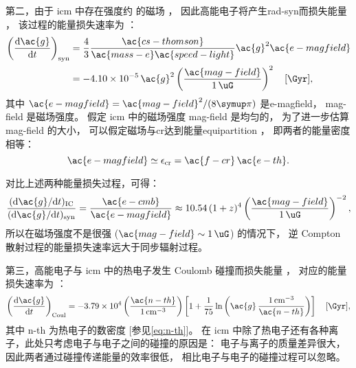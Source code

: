 第二，由于 \ac{icm} 中存在强度约 \si{\uG} 的磁场 \cite{govoni2004,ryu2008}，
因此高能电子将产生\ac{rad-syn}而损失能量 \cite{rybicki1979}，
该过程的能量损失速率为 \cite{sarazin1999}：
\begin{align}
  \label{eq:eloss-syn}
  \left( \diff{\ac{g}}{t} \right)_{\R{syn}}
    & = \frac{4}{3} \frac{\ac{cs-thomson}}{\ac{mass-e} \ac{speed-light}}
        \ac{g}^2 \ac{e-magfield} \\
    & = \num{-4.10e-5} \,\ac{g}^2
        \left( \frac{\ac{mag-field}}{\SI{1}{\uG}} \right)^2
        \quad [\si{\per\Gyr}] ,
\end{align}
其中 $\ac{e-magfield} = \ac{mag-field}^2 / (8\Cpi)$ 是\acl{e-magfield}，
\ac{mag-field} 是磁场强度。
假定 \ac{icm} 中的磁场强度 \ac{mag-field} 是均匀的，
为了进一步估算 \ac{mag-field} 的大小，
可以假定磁场与\ac{cr}达到能量\ac{equipartition} \cite{beck2005}，
即两者的能量密度相等：
\begin{equation}
  \ac{e-magfield} \simeq \epsilon_{\R{cr}} = \ac{f-cr}\,\ac{e-th} .
\end{equation}

对比上述两种能量损失过程，可得：
\begin{equation}
  \frac{(\D{\ac{g}}/\D{t})_{\R{IC}}}{(\D{\ac{g}}/\D{t})_{\R{syn}}}
    = \frac{\ac{e-cmb}}{\ac{e-magfield}}
    \approx 10.54 \,(1+z)^4
      \left( \frac{\ac{mag-field}}{\SI{1}{\uG}} \right)^{-2} ,
\end{equation}
所以在磁场强度不是很强 ($\ac{mag-field} \sim \SI{1}{\uG}$) 的情况下，
逆 Compton 散射过程的能量损失速率远大于同步辐射过程。

第三，高能电子与 \ac{icm} 中的热电子发生 Coulomb 碰撞而损失能量 \cite{rephaeli1979}，
对应的能量损失速率为 \cite{sarazin1999}：
\begin{equation}
  \label{eq:eloss-coul}
  \left( \diff{\ac{g}}{t} \right)_{\R{Coul}} =
    \num{-3.79e4} \left( \frac{\ac{n-th}}{\SI{1}{\per\cm\cubed}} \right)
    \left[ 1 + \frac{1}{75} \ln \left(
        \ac{g}\,\frac{\SI{1}{\per\cm\cubed}}{\ac{n-th}} \right) \right]
    \quad [\si{\per\Gyr}] ,
\end{equation}
其中 \ac{n-th} 为热电子的数密度 [参见\autoref{eq:n-th}]。
在 \ac{icm} 中除了热电子还有各种离子，此处只考虑电子与电子之间的碰撞的原因是：
电子与离子的质量差异很大，因此两者通过碰撞传递能量的效率很低，
相比电子与电子的碰撞过程可以忽略。


